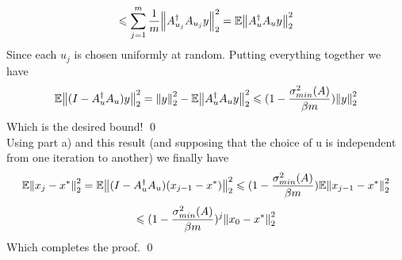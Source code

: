 \documentclass[12pt,letterpaper]{article}
\renewcommand{\le}{\leqslant}
\renewcommand{\ge}{\geqslant}
\begin{document}
\begin{enumerate}
$$\le 
\sum_{j=1}^m \frac{1}{m}\norm{A_{u_j}^\dag A_{u_j}y}_2^2
= 
\mathbb E \norm{A^\dag_uA_uy}^2_2
$$
Since each $u_j$ is chosen uniformly at random.
Putting everything together we have 
$$
\mathbb{E}\norm{(I-A^\dag_uA_u)y}^2_2
=
\norm{y}_2^2-\mathbb{E}\norm{A^\dag_uA_uy}^2_2
\le 
(1- \frac{\sigma^2_{min}(A)}{\beta m})\norm{y}^2_2
$$
Which is the desired bound! \qed\\


Using part a) and this result (and supposing that the choice of u is independent from one iteration to another) we finally have 
$$
\mathbb E \norm{x_j -x^*}_2^2 = \mathbb E  \norm{(I-A_u^\dag A_u)(x_{j-1}-x^*)}_2^2 \le 
(1- \frac{\sigma^2_{min}(A)}{\beta m})\mathbb E \norm{x_{j-1} -x^*}^2_2 
$$   
$$
\le 
(1- \frac{\sigma^2_{min}(A)}{\beta m})^j \norm{x_{0} -x^*}^2_2 
$$
Which completes the proof. \qed
    
\end{enumerate}
\end{document}
